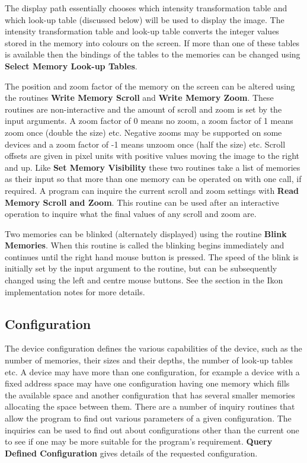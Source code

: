 The display path essentially chooses which intensity transformation
table and which look-up table (discussed below) will be used to display
the image. The intensity transformation table and look-up table converts
the integer values stored in the memory into colours on the screen.
If more than one of these tables is available then the bindings
of the tables to the memories can be changed using
{\bf Select Memory Look-up Tables}.

The position and zoom factor of the memory on the screen can be altered
using the routines {\bf Write Memory Scroll} and {\bf Write Memory Zoom}.
These routines are non-interactive and the amount of scroll and zoom
is set by the input arguments.
A zoom factor of 0 means no zoom, a zoom factor of 1 means zoom once
(double the size) etc. Negative zooms may be supported on some
devices and a zoom factor of -1 means unzoom once (half the size) etc.
Scroll offsets are given in pixel units with positive values moving
the image to the right and up. Like {\bf Set Memory Visibility}
these two routines take a list of memories as their input so that
more than one memory can be operated on with one call, if required.
A program can inquire the current scroll and zoom settings with
{\bf Read Memory Scroll and Zoom}. This routine can be used
after an interactive operation to inquire what the final values of
any scroll and zoom are.

Two memories can be blinked (alternately displayed) using the routine
{\bf Blink Memories}. When this routine is called the blinking begins
immediately and continues until the right hand mouse button is pressed.
The speed of the blink is initially set by the input argument to the
routine, but can be subsequently changed using the left and centre
mouse buttons. See the section in the Ikon implementation notes for
more details.

\subsection{Configuration}

The device configuration defines the various capabilities of the device,
such as the number of memories, their sizes and their depths, the
number of look-up tables etc. A device may have more than one
configuration, for example a device with a fixed address space
may have one configuration having one memory which fills the available
space and another configuration that has several smaller memories
allocating the space between them. There are a number of inquiry routines
that allow the program to find out various parameters of a given
configuration. The inquiries can be used to find out about configurations
other than the current one to see if one may be more suitable for the
program's requirement. {\bf Query Defined Configuration} gives details
of the requested configuration.

